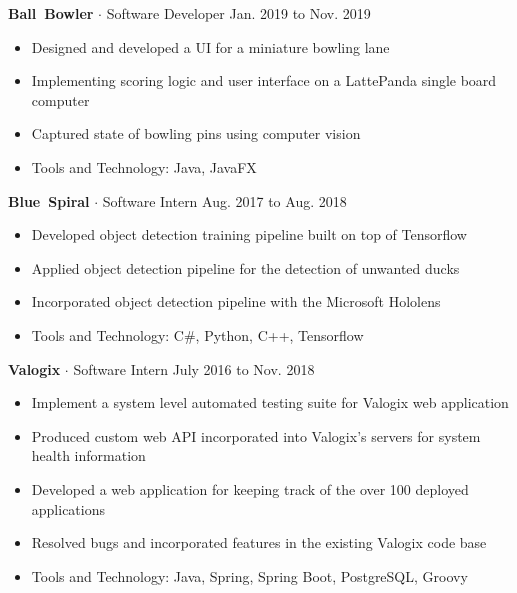 \documentclass{article}
\newcommand{\rSubSubSection}[1] {
  \textbf{{\fontsize{0.35cm}{0.45cm}\selectfont \hbox{#1}}}
}
\begin{document}
\rSubSubSection{Ball Bowler} $ \cdot $ Software Developer \hfill Jan. 2019 to Nov. 2019 \par
\vspace{-10pt}
\begin{itemize}
    \setlength\itemsep{0pt}
    \setlength{\parskip}{0pt}
    \item Designed and developed a UI for a miniature bowling lane
    \item Implementing scoring logic and user interface on a LattePanda single board computer
    \item Captured state of bowling pins using computer vision
    \item Tools and Technology: Java, JavaFX
\end{itemize}
\vspace{-10pt}

\rSubSubSection{Blue Spiral} $ \cdot $ Software Intern \hfill Aug. 2017 to Aug. 2018 \par
\vspace{-10pt}
\begin{itemize}
    \setlength\itemsep{0pt}
    \setlength{\parskip}{0pt}
    \item Developed object detection training pipeline built on top of Tensorflow
    \item Applied object detection pipeline for the detection of unwanted ducks
    \item Incorporated object detection pipeline with the Microsoft Hololens
    \item Tools and Technology: C\#, Python, C++, Tensorflow
\end{itemize}
\vspace{-10pt}

\rSubSubSection{Valogix} $ \cdot $ Software Intern \hfill July 2016 to Nov. 2018 \par
\vspace{-10pt}
\begin{itemize}
    \setlength\itemsep{0pt}
    \setlength{\parskip}{0pt}
    \item Implement a system level automated testing suite for Valogix web application
    \item Produced custom web API incorporated into Valogix's servers for system health information
    \item Developed a web application for keeping track of the over 100 deployed applications
    \item Resolved bugs and incorporated features in the existing Valogix code base
    \item Tools and Technology: Java, Spring, Spring Boot, PostgreSQL, Groovy
\end{itemize}
\vspace{-10pt}
\end{document}
